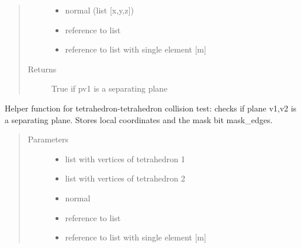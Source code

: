 \documentclass[letterpaper,10pt,english]{sphinxmanual}
\begin{document}
\begin{fulllineitems}
\begin{fulllineitems}
\begin{quote}
\begin{description}
\begin{itemize}
\item {} 
 \textendash{} normal (list {[}x,y,z{]})

\item {} 
 \textendash{} reference to list

\item {} 
 \textendash{} reference to list with single element {[}m{]}

\end{itemize}

\item[{Returns}] \leavevmode
True if pv1 is a separating plane

\end{description}\end{quote}

\end{fulllineitems}


\begin{fulllineitems}
\label{\detokenize{pk_src.collision_tet_tet:pk_src.collision_tet_tet.Collision_tet_tet.separating_plane_faceA_2}}
Helper function for tetrahedron-tetrahedron collision test:
checks if plane v1,v2 is a separating plane. Stores local coordinates and the mask bit mask\_edges.
\begin{quote}\begin{description}
\item[{Parameters}] \leavevmode\begin{itemize}
\item {} 
 \textendash{} list with vertices of tetrahedron 1

\item {} 
 \textendash{} list with vertices of tetrahedron 2

\item {} 
 \textendash{} normal

\item {} 
 \textendash{} reference to list

\item {} 
 \textendash{} reference to list with single element {[}m{]}


\end{itemize}
\end{description}
\end{quote}
\end{fulllineitems}
\end{fulllineitems}
\end{document}
